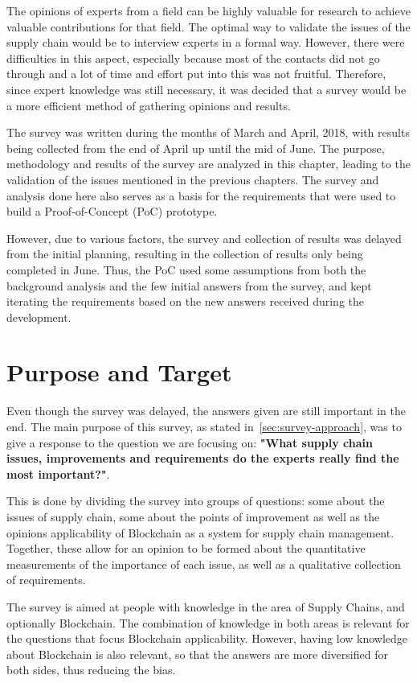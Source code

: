 The opinions of experts from a field can be highly valuable for research to achieve valuable contributions for that field. The optimal way to validate the issues of the supply chain would be to interview experts in a formal way. However, there were difficulties in this aspect, especially because most of the contacts did not go through and a lot of time and effort put into this was not fruitful. Therefore, since expert knowledge was still necessary, it was decided that a survey would be a more efficient method of gathering opinions and results.

The survey was written during the months of March and April, 2018, with results being collected from the end of April up until the mid of June. The purpose, methodology and results of the survey are analyzed in this chapter, leading to the validation of the issues mentioned in the previous chapters. The survey and analysis done here also serves as a basis for the requirements that were used to build a Proof-of-Concept (PoC) prototype. 

However, due to various factors, the survey and collection of results was delayed from the initial planning, resulting in the collection of results only being completed in June. Thus, the PoC used some assumptions from both the background analysis and the few initial answers from the survey, and kept iterating the requirements based on the new answers received during the development. 


\section{Purpose and Target}
Even though the survey was delayed, the answers given are still important in the end. The main purpose of this survey, as stated in~\ref{sec:survey-approach}, was to give a response to the question we are focusing on: \textbf{"What supply chain issues, improvements and requirements do the experts really find the most important?"}. 



This is done by dividing the survey into groups of questions: some about the issues of supply chain, some about the points of improvement as well as the opinions applicability of Blockchain as a system for supply chain management. Together, these allow for an opinion to be formed about the quantitative measurements of the importance of each issue, as well as a qualitative collection of requirements.

The survey is aimed at people with knowledge in the area of Supply Chains, and optionally Blockchain. The combination of knowledge in both areas is relevant for the questions that focus Blockchain applicability. However, having low knowledge about Blockchain is also relevant, so that the answers are more diversified for both sides, thus reducing the bias. %

